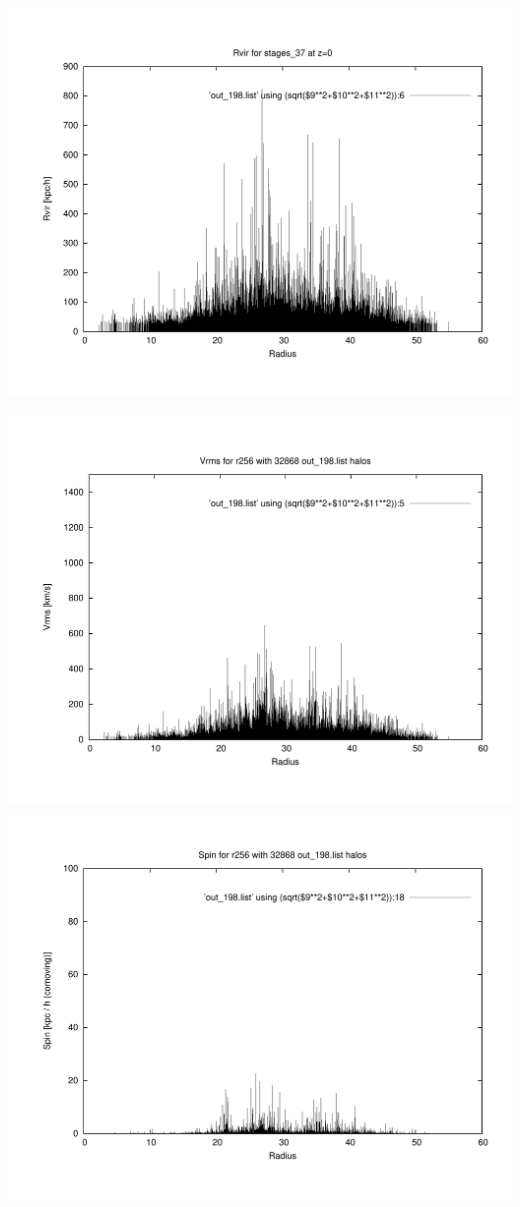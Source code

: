 \includegraphics[scale=0.3]{stages_37/plot_rvir_z0.pdf}

\includegraphics[scale=0.3]{stages_37/plot_Vrms_out_198.pdf}
\includegraphics[scale=0.3]{stages_37/plot_spin_out_198.pdf}


